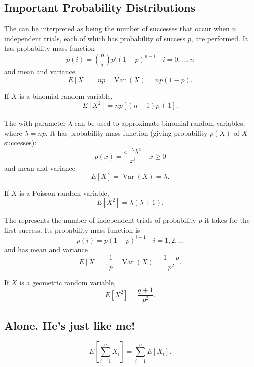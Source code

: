 \documentclass{article}
\DeclareMathOperator{\Var}{\textrm{Var}}
\begin{document}
\subsection{Important Probability Distributions}

\begin{definition}
    The  can be interpreted as being the number of successes that occur when $n$ independent trials, each of which has probability of success $p$, are performed.
    It has probability mass function 
    \[p(i)={n\choose i}p^{i}(1-p)^{n-i}\quad i=0,\dotsc,n \]and mean and variance
    \[E[X]=np\quad \Var(X)=np(1-p).\]
\end{definition}
\begin{remark}
    If $X$ is a binomial random variable, 
    \[E[X^{2}]=np[(n-1)p+1].\]
\end{remark}
\begin{definition}
    The  with parameter $\lambda$ can be used to approximate binomial random variables, where $\lambda=np$. It has probability mass function (giving probability $p(X)$ of $X$ successes):
    \[p(x)=\frac{e^{-\lambda}\lambda^{x}}{x!}\quad x\geq 0\]and mean and variance
    \[E[X]=\Var(X)=\lambda.\]
\end{definition}
\begin{remark}
    If $X$ is a Poisson random variable, \[E[X^{2}]=\lambda(\lambda+1).\]
\end{remark}
\begin{definition}
    The  represents the number of independent trials of probability $p$ it takes for the first success. Its probability mass function is 
    \[p(i)=p(1-p)^{i-1}\quad i=1,2,\dotsc\]and has mean and variance
    \[E[X]=\frac{1}{p}\quad \Var(X)=\frac{1-p}{p^{2}}.\]
\end{definition}
\begin{remark}
    If $X$ is a geometric random variable,
    \[E[X^{2}]=\frac{q+1}{p^{2}}.\]
\end{remark}

\subsection{Alone. He's just like me!}
\begin{theorem}
    \[E\left[\sum_{i=1}^{n}X_{i}\right]=\sum_{i=1}^{n}E[X_{i}].\]
\end{theorem}
\end{document}
